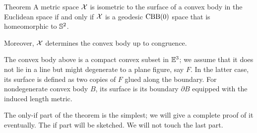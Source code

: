 \begin{thm}{Theorem}\label{thm:alexandrov+pogorelov}
A metric space $\mathcal{X}$ is isometric to the surface of a convex body in the Euclidean space if and only if $\mathcal{X}$ is a geodesic $\mathrm{CBB}(0)$ space that is homeomorphic to $\mathbb{S}^2$.

Moreover, $\mathcal{X}$ determines the convex body up to congruence.
\end{thm}

The convex body above is a compact convex subset in $\mathbb{E}^3$;
we assume that it does not lie in a line but might degenerate to a plane figure, say $F$.
In the latter case, its surface is defined as two copies of $F$ glued along the boundary.
For nondegenerate convex body $B$, its surface is its boundary $\partial B$ equipped with the induced length metric. 

The only-if part of the theorem is the simplest; we will give a complete proof of it eventually.
The if part will be sketched.
We will not touch the last part.

